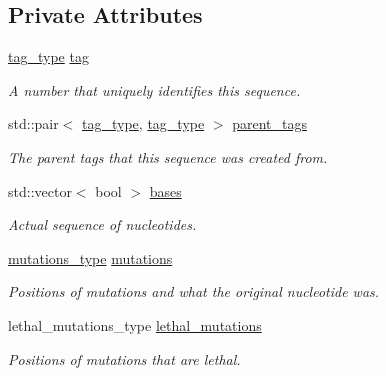 \subsection*{Private Attributes}
\begin{DoxyCompactItemize}
\item 
\mbox{\hyperlink{constants_8h_a3e6daf1646e952257330d8cfe20e96f8}{tag\+\_\+type}} \mbox{\hyperlink{classrcombinator_1_1Sequence_a6f20589d14483addafdc75aa9448c2a2}{tag}}
\begin{DoxyCompactList}\small\item\em A number that uniquely identifies this sequence. \end{DoxyCompactList}\item 
std\+::pair$<$ \mbox{\hyperlink{constants_8h_a3e6daf1646e952257330d8cfe20e96f8}{tag\+\_\+type}}, \mbox{\hyperlink{constants_8h_a3e6daf1646e952257330d8cfe20e96f8}{tag\+\_\+type}} $>$ \mbox{\hyperlink{classrcombinator_1_1Sequence_a81a264faf65b131fe857511680b5aa25}{parent\+\_\+tags}}
\begin{DoxyCompactList}\small\item\em The parent tags that this sequence was created from. \end{DoxyCompactList}\item 
std\+::vector$<$ bool $>$ \mbox{\hyperlink{classrcombinator_1_1Sequence_ab37aa0bdc97b3d923407e3a7e17b3209}{bases}}
\begin{DoxyCompactList}\small\item\em Actual sequence of nucleotides. \end{DoxyCompactList}\item 
\mbox{\hyperlink{classrcombinator_1_1Sequence_a4adff5141a0bf95a89b350ef5008000d}{mutations\+\_\+type}} \mbox{\hyperlink{classrcombinator_1_1Sequence_a8aac49ef635b95fe0088e5fb59e2bce7}{mutations}}
\begin{DoxyCompactList}\small\item\em Positions of mutations and what the {\itshape original} nucleotide was. \end{DoxyCompactList}\item 
lethal\+\_\+mutations\+\_\+type \mbox{\hyperlink{classrcombinator_1_1Sequence_abbef2567c1f68239c80769db85455b00}{lethal\+\_\+mutations}}
\begin{DoxyCompactList}\small\item\em Positions of mutations that are lethal. \end{DoxyCompactList}\end{DoxyCompactItemize}
